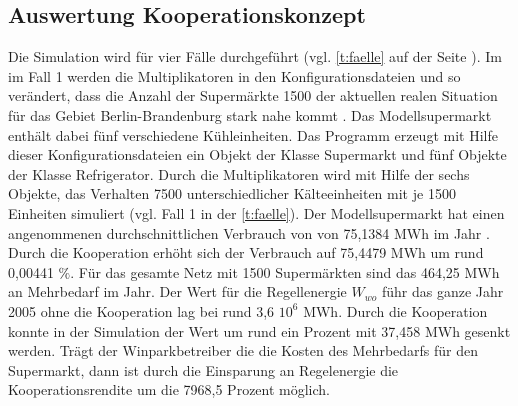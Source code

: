 \subsection{Auswertung Kooperationskonzept}
Die Simulation wird f\"ur vier F\"alle durchgef\"uhrt (vgl. \cref{t:faelle} auf
der Seite \pageref{t:faelle}). Im im Fall 1 werden die Multiplikatoren in den
Konfigurationsdateien  und  so ver\"andert, dass
die Anzahl der Superm\"arkte 1500 der aktuellen realen Situation f\"ur das
Gebiet Berlin-Brandenburg stark nahe kommt \cite{caro}. Das Modellsupermarkt
enth\"alt dabei f\"unf verschiedene K\"uhleinheiten. Das Programm erzeugt mit
Hilfe dieser Konfigurationsdateien ein Objekt der Klasse Supermarkt und f\"unf
Objekte der Klasse Refrigerator. Durch die Multiplikatoren wird mit Hilfe der
sechs Objekte, das Verhalten 7500 unterschiedlicher K\"alteeinheiten mit je 1500
Einheiten simuliert (vgl. Fall 1 in der \cref{t:faelle}). Der Modellsupermarkt
hat einen angenommenen durchschnittlichen Verbrauch von von 75,1384 MWh im Jahr
\cite{caro}. Durch die Kooperation erh\"oht sich der Verbrauch auf 75,4479 MWh
um rund 0,00441 $\%$.  F\"ur das gesamte Netz mit 1500 Superm\"arkten sind das
464,25 MWh an Mehrbedarf im Jahr. Der Wert f\"ur die Regellenergie $W_{wo}$
f\"uhr das ganze Jahr 2005  ohne die Kooperation lag bei
rund 3,6 $10^6$ MWh. Durch die Kooperation konnte in der Simulation der Wert um
rund ein Prozent mit 37,458 MWh gesenkt werden. Tr\"agt der Winparkbetreiber die
die Kosten des Mehrbedarfs f\"ur den Supermarkt, dann ist durch die Einsparung
an Regelenergie die Kooperationsrendite um die 7968,5 Prozent m\"oglich.

